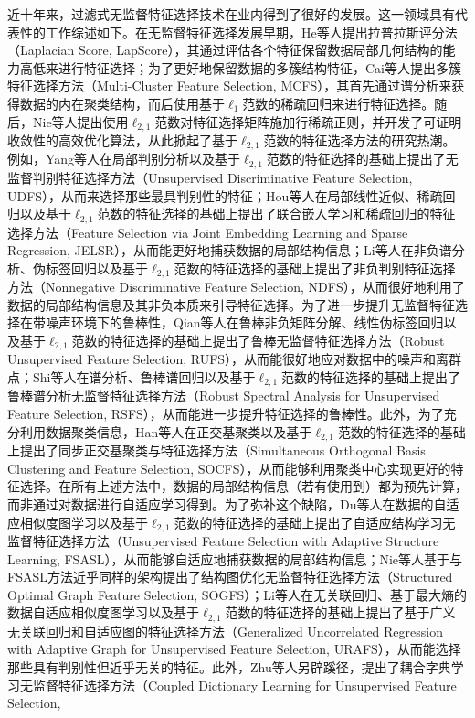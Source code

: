 
近十年来，过滤式无监督特征选择技术在业内得到了很好的发展。这一领域具有代表性的工作综述如下。在无监督特征选择发展早期，He等人提出拉普拉斯评分法（Laplacian Score, LapScore），其通过评估各个特征保留数据局部几何结构的能力高低来进行特征选择；为了更好地保留数据的多簇结构特征，Cai等人提出多簇特征选择方法（Multi-Cluster Feature Selection, MCFS），其首先通过谱分析来获得数据的内在聚类结构，而后使用基于$\ell_{1}$范数的稀疏回归来进行特征选择。随后，Nie等人提出使用$\ell_{2,1}$范数对特征选择矩阵施加行稀疏正则，并开发了可证明收敛性的高效优化算法，从此掀起了基于$\ell_{2,1}$范数的特征选择方法的研究热潮。例如，Yang等人在局部判别分析以及基于$\ell_{2,1}$范数的特征选择的基础上提出了无监督判别特征选择方法（Unsupervised Discriminative Feature Selection, UDFS），从而来选择那些最具判别性的特征；Hou等人在局部线性近似、稀疏回归以及基于$\ell_{2,1}$范数的特征选择的基础上提出了联合嵌入学习和稀疏回归的特征选择方法（Feature Selection via Joint Embedding Learning and Sparse Regression, JELSR），从而能更好地捕获数据的局部结构信息；Li等人在非负谱分析、伪标签回归以及基于$\ell_{2,1}$范数的特征选择的基础上提出了非负判别特征选择方法（Nonnegative Discriminative Feature Selection, NDFS），从而很好地利用了数据的局部结构信息及其非负本质来引导特征选择。为了进一步提升无监督特征选择在带噪声环境下的鲁棒性，Qian等人在鲁棒非负矩阵分解、线性伪标签回归以及基于$\ell_{2,1}$范数的特征选择的基础上提出了鲁棒无监督特征选择方法（Robust Unsupervised Feature Selection, RUFS），从而能很好地应对数据中的噪声和离群点；Shi等人在谱分析、鲁棒谱回归以及基于$\ell_{2,1}$范数的特征选择的基础上提出了鲁棒谱分析无监督特征选择方法（Robust Spectral Analysis for Unsupervised Feature Selection, RSFS），从而能进一步提升特征选择的鲁棒性。此外，为了充分利用数据聚类信息，Han等人在正交基聚类以及基于$\ell_{2,1}$范数的特征选择的基础上提出了同步正交基聚类与特征选择方法（Simultaneous Orthogonal Basis Clustering and Feature Selection, SOCFS），从而能够利用聚类中心实现更好的特征选择。在所有上述方法中，数据的局部结构信息（若有使用到）都为预先计算，而非通过对数据进行自适应学习得到。为了弥补这个缺陷，Du等人在数据的自适应相似度图学习以及基于$\ell_{2,1}$范数的特征选择的基础上提出了自适应结构学习无监督特征选择方法（Unsupervised Feature Selection with Adaptive Structure Learning, FSASL），从而能够自适应地捕获数据的局部结构信息；Nie等人基于与FSASL方法近乎同样的架构提出了结构图优化无监督特征选择方法（Structured Optimal Graph Feature Selection, SOGFS）；Li等人在无关联回归、基于最大熵的数据自适应相似度图学习以及基于$\ell_{2,1}$范数的特征选择的基础上提出了基于广义无关联回归和自适应图的特征选择方法（Generalized Uncorrelated Regression with Adaptive Graph for Unsupervised Feature Selection, URAFS），从而能选择那些具有判别性但近乎无关的特征。此外，Zhu等人另辟蹊径，提出了耦合字典学习无监督特征选择方法（Coupled Dictionary Learning for Unsupervised Feature Selection, 
